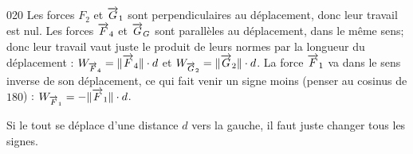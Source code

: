 

\begin{corrige}{020}
Les forces $F_2$ et $\overrightarrow{G}_1$ sont perpendiculaires au déplacement, donc leur travail est nul. Les forces $\overrightarrow{F}_4$ et $\overrightarrow{G}_G$ sont parallèles au déplacement, dans le même sens; donc leur travail vaut juste le produit de leurs normes par la longueur du déplacement : $W_{\overrightarrow{F}_4}=\| \overrightarrow{F}_4 \|\cdot d$ et $W_{\overrightarrow{G}_2}=\| \overrightarrow{G}_2 \|\cdot d$. La force $\overrightarrow{F}_1$ va dans le sens inverse de son déplacement, ce qui fait venir un signe moins (penser au cosinus de $180$) : $W_{\overrightarrow{F}_1}=-\| \overrightarrow{F}_1 \|\cdot d$.

Si le tout se déplace d'une distance $d$ vers la gauche, il faut juste changer tous les signes.
\end{corrige}
